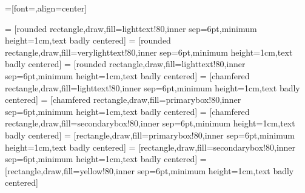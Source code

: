 




=[font=\rmfamily,align=center]

\newcommand{\fillOpacity}{80}

\newcommand{\compShape}{rectangle}
\newcommand{\groupShape}{chamfered rectangle}
\newcommand{\procShape}{rounded rectangle}

\newcommand{\explicitColor}{primarybox}
\newcommand{\implicitColor}{secondarybox}
\newcommand{\mdaColor}{verylighttext}
\newcommand{\optimizationColor}{lighttext} %

 = [\procShape,draw,fill=\optimizationColor!\fillOpacity,inner sep=6pt,minimum height=1cm,text badly centered]   %
 = [\procShape,draw,fill=\mdaColor!\fillOpacity,inner sep=6pt,minimum height=1cm,text badly centered]
 = [\procShape,draw,fill=\optimizationColor!\fillOpacity,inner sep=6pt,minimum height=1cm,text badly centered]
 = [\groupShape,draw,fill=\optimizationColor!\fillOpacity,inner sep=6pt,minimum height=1cm,text badly centered]
 = [\groupShape,draw,fill=\explicitColor!\fillOpacity,inner sep=6pt,minimum height=1cm,text badly centered]
 = [\groupShape,draw,fill=\implicitColor!\fillOpacity,inner sep=6pt,minimum height=1cm,text badly centered]
 = [\compShape,draw,fill=\explicitColor!\fillOpacity,inner sep=6pt,minimum height=1cm,text badly centered]
 = [\compShape,draw,fill=\implicitColor!\fillOpacity,inner sep=6pt,minimum height=1cm,text badly centered]
 = [\compShape,draw,fill=yellow!\fillOpacity,inner sep=6pt,minimum height=1cm,text badly centered]

